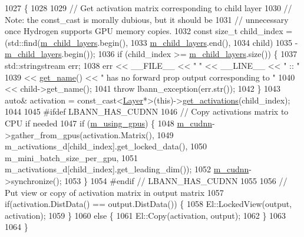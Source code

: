 \begin{DoxyCode}
1027                                                                       \{
1028 
1029   \textcolor{comment}{// Get activation matrix corresponding to child layer}
1030   \textcolor{comment}{// Note: the const\_cast is morally dubious, but it should be}
1031   \textcolor{comment}{// unnecessary once Hydrogen supports GPU memory copies.}
1032   \textcolor{keyword}{const} \textcolor{keywordtype}{size\_t} child\_index = (std::find(\hyperlink{classlbann_1_1Layer_ae348c0d2b4d05f74d809d09debb633c0}{m\_child\_layers}.begin(),
1033                                         \hyperlink{classlbann_1_1Layer_ae348c0d2b4d05f74d809d09debb633c0}{m\_child\_layers}.end(),
1034                                         child)
1035                               - \hyperlink{classlbann_1_1Layer_ae348c0d2b4d05f74d809d09debb633c0}{m\_child\_layers}.begin());
1036   \textcolor{keywordflow}{if} (child\_index >= \hyperlink{classlbann_1_1Layer_ae348c0d2b4d05f74d809d09debb633c0}{m\_child\_layers}.size()) \{
1037     std::stringstream err;
1038     err << \_\_FILE\_\_ << \textcolor{stringliteral}{" "} << \_\_LINE\_\_ << \textcolor{stringliteral}{" :: "}
1039         << \hyperlink{classlbann_1_1Layer_a80027550202fa7dbb1dd55fa8a66c84b}{get\_name}() << \textcolor{stringliteral}{" has no forward prop output corresponding to "}
1040         << child->get\_name();
1041     \textcolor{keywordflow}{throw} lbann\_exception(err.str());
1042   \}
1043   \textcolor{keyword}{auto}& activation = \textcolor{keyword}{const\_cast<}\hyperlink{classlbann_1_1Layer_a24e9c82354a0a2af1b70cbca2211e7d4}{Layer}*\textcolor{keyword}{>}(\textcolor{keyword}{this})->\hyperlink{classlbann_1_1Layer_a1134b1a4385af199d7272c5aa827fa99}{get\_activations}(child\_index);
1044 
1045 \textcolor{preprocessor}{#ifdef LBANN\_HAS\_CUDNN}
1046   \textcolor{comment}{// Copy activations matrix to CPU if needed}
1047   \textcolor{keywordflow}{if} (\hyperlink{classlbann_1_1Layer_af7881cb5eff5207c15fa835d65462e8f}{m\_using\_gpus}) \{
1048     \hyperlink{classlbann_1_1Layer_a08dbb94239e3b8c96329786c57c72e21}{m\_cudnn}->gather\_from\_gpus(activation.Matrix(),
1049                               m\_activations\_d[child\_index].get\_locked\_data(),
1050                               m\_mini\_batch\_size\_per\_gpu,
1051                               m\_activations\_d[child\_index].get\_leading\_dim());
1052     \hyperlink{classlbann_1_1Layer_a08dbb94239e3b8c96329786c57c72e21}{m\_cudnn}->synchronize();
1053   \}
1054 \textcolor{preprocessor}{#endif // LBANN\_HAS\_CUDNN}
1055 
1056   \textcolor{comment}{// Put view or copy of activation matrix in output matrix}
1057   \textcolor{keywordflow}{if}(activation.DistData() == output.DistData()) \{
1058     El::LockedView(output, activation);
1059   \}
1060   \textcolor{keywordflow}{else} \{
1061     El::Copy(activation, output);
1062   \}
1063 
1064 \}
\end{DoxyCode}

